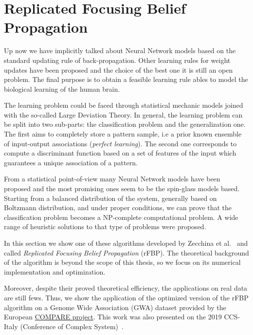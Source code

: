 \documentclass{standalone}
\begin{document}
\section[rFBP]{Replicated Focusing Belief Propagation}\label{rfbp:rfbp}

Up now we have implicitly talked about Neural Network models based on the standard updating rule of back-propagation.
Other learning rules for weight updates have been proposed and the choice of the best one it is still an open problem.
The final purpose is to obtain a feasible learning rule ables to model the biological learning of the human brain.

The learning problem could be faced through statistical mechanic models joined with the so-called Large Deviation Theory.
In general, the learning problem can be split into two sub-parts: the classification problem and the generalization one.
The first aims to completely store a pattern sample, i.e a prior known ensemble of input-output associations (\emph{perfect learning}).
The second one corresponds to compute a discriminant function based on a set of features of the input which guarantees a unique association of a pattern.

From a statistical point-of-view many Neural Network models have been proposed and the most promising ones seem to be the spin-glass models based.
Starting from a balanced distribution of the system, generally based on Boltzmann distribution, and under proper conditions, we can prove that the classification problem becomes a NP-complete computational problem.
A wide range of heuristic solutions to that type of problems were proposed.

In this section we show one of these algorithms developed by Zecchina et al.~\cite{BaldassiE7655} and called \emph{Replicated Focusing Belief Propagation} (rFBP).
The theoretical background of the algorithm is beyond the scope of this thesis, so we focus on its numerical implementation and optimization.

Moreover, despite their proved theoretical efficiency, the applications on real data are still fews.
Thus, we show the application of the optimized version of the rFBP algorithm on a Genome Wide Association (GWA) dataset provided by the European \href{https://www.compare-europe.eu/}{COMPARE project}.
This work was also presented on the 2019 CCS-Italy (Conference of Complex System)~\cite{DallOlioCCS19}.
\end{document}
